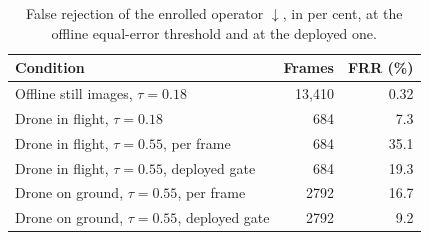 \begin{table}[t]
\caption{False rejection of the enrolled operator $\downarrow$, in per cent, at the offline equal-error threshold and at the deployed one.}
\label{tab:frr}
\centering
\footnotesize
\setlength{\tabcolsep}{4pt}
\renewcommand{\arraystretch}{1.02}
\begin{tabular}{@{}lrr@{}}
\toprule
Condition & Frames & FRR (\%) \\
\midrule
Offline still images, $\tau=0.18$ & 13{,}410 & 0.32 \\
Drone in flight, $\tau=0.18$ & 684 & 7.3 \\
Drone in flight, $\tau=0.55$, per frame & 684 & 35.1 \\
Drone in flight, $\tau=0.55$, deployed gate & 684 & 19.3 \\
Drone on ground, $\tau=0.55$, per frame & 2792 & 16.7 \\
Drone on ground, $\tau=0.55$, deployed gate & 2792 & 9.2 \\
\bottomrule
\end{tabular}
\end{table}
